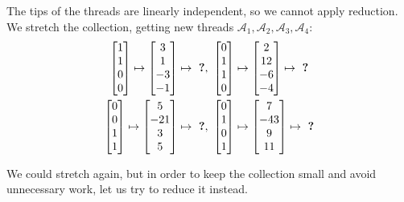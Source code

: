 \documentclass[12pt]{article}
\newcommand{\1}{\mathbf{1}}
\newcommand{\0}{\mathbf{0}}
\newcommand{\A}{\mathcal{A}}
\theoremstyle{definition}
\begin{document}
The tips of the threads are linearly independent, so we cannot apply reduction.
We stretch the collection, getting new
threads
$\A_1,\A_2,\A_3,\A_4$:
\[
\begin{gathered}
\left[\begin{matrix}1 \\ 1 \\ 0 \\ 0\end{matrix}\right]
\mapsto
\left[\begin{matrix}3 \\ 1 \\ -3 \\ -1\end{matrix}\right]
\mapsto
\text{ \bf ?}
,\
\left[\begin{matrix}0 \\ 1 \\ 1 \\ 0\end{matrix}\right]
\mapsto
\left[\begin{matrix}2 \\ 12 \\ -6 \\ -4\end{matrix}\right]
\mapsto
\text{ \bf ?}
\\
\left[\begin{matrix}0 \\ 0 \\ 1 \\ 1\end{matrix}\right]
\mapsto
\left[\begin{matrix}5 \\ -21 \\ 3 \\ 5\end{matrix}\right]
\mapsto
\text{ \bf ?}
,\
\left[\begin{matrix}0 \\ 1 \\ 0 \\ 1\end{matrix}\right]
\mapsto
\left[\begin{matrix}7 \\ -43 \\ 9 \\ 11\end{matrix}\right]
\mapsto
\text{ \bf ?}
\end{gathered}
\]

We could stretch again, but in order to keep the collection small and avoid unnecessary work, let us try to reduce it instead.
\end{document}
